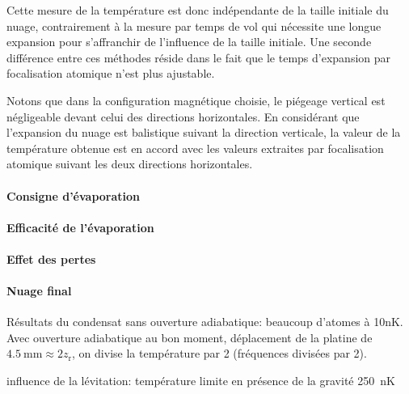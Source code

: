 Cette mesure de la température est donc indépendante de la taille initiale du nuage, contrairement à la mesure par temps de vol qui nécessite une longue expansion pour s'affranchir de l'influence de la taille initiale. Une seconde différence entre ces méthodes réside dans le fait que le temps d'expansion par focalisation atomique n'est plus ajustable. 

Notons que dans la configuration magnétique choisie, le piégeage vertical est négligeable devant celui des directions horizontales. En considérant que l'expansion du nuage est balistique suivant la direction verticale, la valeur de la température obtenue est en accord avec les valeurs extraites par focalisation atomique suivant les deux directions horizontales.

\paragraph*{Consigne d'évaporation}
\paragraph*{Efficacité de l'évaporation}
\paragraph*{Effet des pertes}
\paragraph*{Nuage final}
Résultats du condensat sans ouverture adiabatique: beaucoup d'atomes à 10nK. Avec ouverture adiabatique au bon moment, déplacement de la platine de $\SI{4.5}{\milli\metre}\approx 2 z_{\mathrm{r}}$, on divise la température par 2 (fréquences divisées par 2).





influence de la lévitation: température limite en présence de la gravité \SI{250}{\nano\kelvin}
